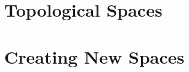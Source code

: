 \tableofcontents



\chapter{Topological Spaces}









\chapter{Creating New Spaces}
















































%